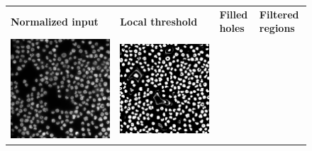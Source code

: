 \begin{figure}[H]
    \centering
    \centering
        \begin{tabularx}{\textwidth}{YYYY}
            \textbf{Normalized input} &
            \textbf{Local threshold} &
            \textbf{Filled holes} &
            \textbf{Filtered regions} \\
            \includegraphics{bilder/segmentation/nuclei-mask/normalized.png} & \includegraphics{bilder/segmentation/nuclei-mask/binary_local.png} &

\end{tabularx}
\end{figure}

